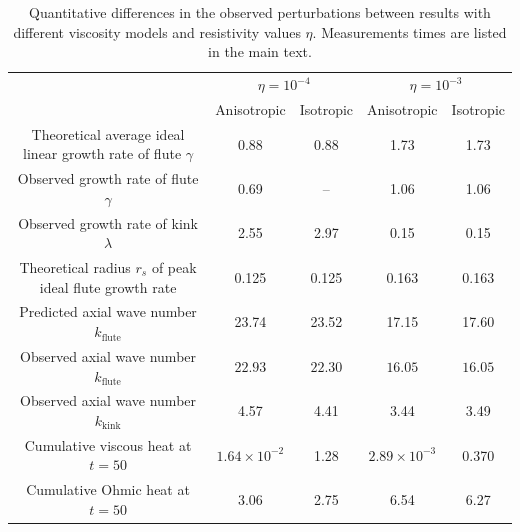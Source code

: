 \documentclass[fleqn,usenatbib]{mnras}
\newcommand{\rev}[1]{{\color{red} {#1}}}
\begin{document}
\begin{table}
  \caption{
Quantitative differences in the observed perturbations between results
\rev{with} different \rev{viscosity models and} resistivity values
$\eta$. Measurements times are listed in the main text.}  
\centering
\begin{tabular}{ccccc}
&\multicolumn{2}{c}{$\eta=10^{-4}$}& \multicolumn{2}{c}{$\eta=10^{-3}$} \\
&
Anisotropic &
\rev{Isotropic} &
Anisotropic &
\rev{Isotropic} \\
\midrule
Theoretical average ideal linear growth rate of flute $\gamma$
& 0.88 
& \rev{0.88} 
& 1.73 
& \rev{1.73} \\
Observed growth rate of flute $\gamma$
& 0.69 
& \rev{--} 
& 1.06 
& \rev{1.06}\\
Observed growth rate of kink $\lambda$
& 2.55 
& \rev{2.97} 
& 0.15 
& \rev{0.15}\\
\midrule
Theoretical radius $r_s$ of peak ideal flute growth rate
& 0.125 
& \rev{0.125} 
& 0.163 
& \rev{0.163}\\
\midrule
\rev{Predicted axial wave number $k_{\text{flute}}$}
& \rev{23.74}
& \rev{23.52}
& \rev{17.15}
& \rev{17.60}\\
Observed axial wave number $k_{\text{flute}}$
& \rev{$22.93$}
& \rev{$22.30$}
& \rev{$16.05$}
& \rev{$16.05$}\\
Observed axial wave number $k_{\text{kink}}$
& {4.57}
& \rev{4.41}
& {3.44}
& \rev{3.49}\\
\midrule
\rev{Cumulative viscous heat at $t=50$}
& \rev{$1.64 \times 10^{-2}$}
& \rev{1.28}
& \rev{$2.89 \times 10^{-3}$}
& \rev{0.370} \\
\rev{Cumulative Ohmic heat at $t=50$}
& \rev{3.06}
& \rev{2.75} 
& \rev{6.54} 
& \rev{6.27} \\
\end{tabular}
\label{tab:kink_fluting_params}
\end{table}
\end{document}
